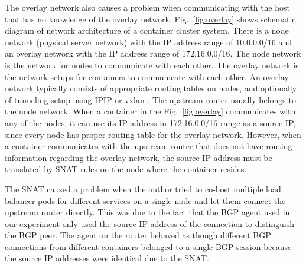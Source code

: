 The overlay network also causes a problem when communicating with the host that has no knowledge of the overlay network.
Fig.~\ref{fig:overlay} shows schematic diagram of network architecture of a container cluster system. 
There is a node network (physical server network) with the IP address range of 10.0.0.0/16 and an overlay network with the IP address range of 172.16.0.0/16.
The node network is the network for nodes to communicate with each other.
The overlay network is the network setups for containers to communicate with each other.
An overlay network typically consists of appropriate routing tables on nodes, and optionally of tunneling setup using IPIP \cite{kuznetsov1999tunnels} or vxlan \cite{zismer2016performance}.
The upstream router usually belongs to the node network.
When a container in the Fig.~\ref{fig:overlay} communicates with any of the nodes, it can use its IP address in 172.16.0.0/16 range as a source IP, since every node has proper routing table for the overlay network.
However, when a container communicates with the upstream router that does not have routing information regarding the overlay network, the source IP address must be translated by SNAT rules on the node where the container resides.

The SNAT caused a problem when the author tried to co-host multiple load balancer pods for different services on a single node and let them connect the upstream router directly.
This was due to the fact that the BGP agent used in our experiment only used the source IP address of the connection to distinguish the BGP peer.
The agent on the router behaved as though different BGP connections from different containers belonged to a single BGP session because the source IP addresses were identical due to the SNAT.

